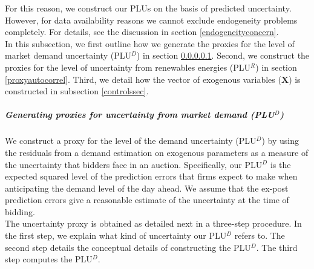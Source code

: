 For this reason, we construct our PLUs on the basis of predicted uncertainty. However, for data availability reasons we cannot exclude endogeneity problems completely. For details, see the discussion in section \ref{endogeneityconcern}.  \\

In this subsection, we first outline how we generate the proxies for the level of market demand uncertainty (PLU$^D$) in section \ref{proxyunc}. Second, we construct the proxies for the level of uncertainty from renewables energies (PLU$^R$) in section \ref{proxyautocorrel}. Third, we detail how the vector of exogenous variables ($\boldsymbol{X}$) is constructed in subsection \ref{controlssec}.  \\


\subparagraph{Generating proxies for uncertainty from market demand (PLU$^D$)}
\label{proxyunc}

We construct a proxy for the level of the demand uncertainty (PLU$^{D}$) by using the residuals from a demand estimation on exogenous parameters as a measure of the uncertainty that bidders face in an auction. Specifically, our PLU$^D$ is the expected squared level of the prediction errors that firms expect to make when anticipating the demand level of the day ahead. We assume that the ex-post prediction errors give a reasonable estimate of the uncertainty at the time of bidding. \\




The uncertainty proxy
is obtained as detailed next in a three-step procedure. In the first step, we explain what kind of uncertainty our PLU$^D$ refers to. The second step details the conceptual details of constructing the PLU$^D$. The third step computes the PLU$^D$. %

